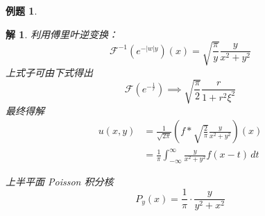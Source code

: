 \documentclass[12pt,a4paper]{article}
\numberwithin{subsection}{section}   %
\numberwithin{subsubsection}{subsection}
\theoremstyle{plain}
\newtheorem{solution}{解}[section]  %
\theoremstyle{definition}
\newtheorem{example}{例题}[section]  %
\theoremstyle{remark}
\theoremstyle{remark}
\begin{document}
\begin{example}
\begin{solution}
利用傅里叶逆变换：
\begin{equation}
	\mathcal{F}^{-1}\left(e^{-|w| y}\right)(x) = \sqrt{\dfrac{\pi}{y}} \dfrac{y}{x^2 + y^2}
\end{equation}
上式子可由下式得出
	\begin{equation}
	\mathcal{F}\left(e^{-\frac{1}{r}}\right) \implies \sqrt{\dfrac{\pi}{2}} \dfrac{r}{1 + r^2 \xi^2}
\end{equation}
	最终得解
\begin{equation}
	\begin{aligned}
		u(x, y) &= \frac{1}{\sqrt{2 \pi}}\left(f * \sqrt{\frac{2}{\pi}} \frac{y}{x^{2} + y^{2}}\right)(x) \\
		&= \frac{1}{\pi} \int_{-\infty}^{\infty} \frac{y}{x^{2} + y^{2}} f(x - t) \, dt
	\end{aligned}
\end{equation}
	
	上半平面 Poisson 积分核
	\begin{equation}
			P_y(x) = \dfrac{1}{\pi} \cdot \dfrac{y}{y^2 + x^2}
	\end{equation}
	
	\end{solution}
\end{example}
\end{document}
